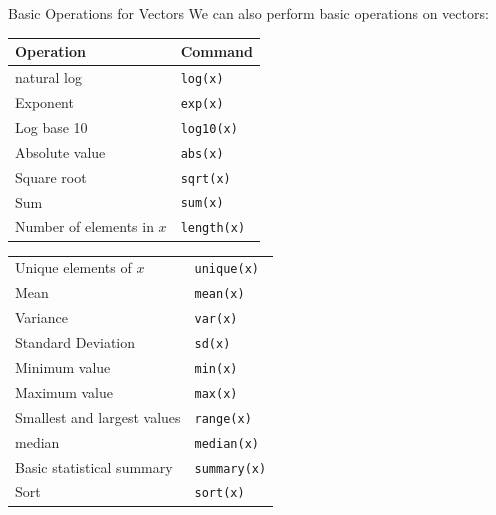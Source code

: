 \documentclass[xcolor=svgnames, 10pt]{beamer}
\begin{document}
\begin{frame}[fragile]{Basic Operations for Vectors}
We can also perform basic operations on vectors:
\begin{center}
\begin{tabular}{ll}
Operation & Command \\\hline 
natural log & \verb!log(x)!\\
Exponent & \verb!exp(x)!\\
Log base 10 & \verb!log10(x)!\\
Absolute value & \verb!abs(x)!\\
Square root & \verb!sqrt(x)!\\
Sum & \verb!sum(x)!\\
Number of elements in $x$  & \verb!length(x)!\\
\end{tabular}
\end{center}
\end{frame}


\begin{frame}[fragile]{}
\begin{center}
\begin{tabular}{ll}
Unique elements of $x$ & \verb!unique(x)!\\
Mean & \verb!mean(x)!\\
Variance & \verb!var(x)!\\
Standard Deviation & \verb!sd(x)!\\
Minimum value & \verb!min(x)!\\
Maximum value & \verb!max(x)!\\
Smallest and largest values  & \verb!range(x)!\\
median & \verb!median(x)!\\
Basic statistical summary & \verb!summary(x)!\\
Sort & \verb!sort(x)!\\
\end{tabular}
\end{center}
\end{frame}
\end{document}
